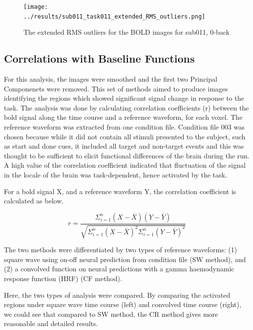 \documentclass[11pt]{article}
\begin{document}
\begin{figure}[H]
\centering
\texttt{[image: ../results/sub011\_task011\_extended\_RMS\_outliers.png]}
\caption{The extended RMS outliers for the BOLD images for sub011, 0-back}
\end{figure} 

\subsection{Correlations with Baseline Functions}

For this analysis, the images were smoothed and the first two Principal Componenets were
removed. This set of methods aimed to produce images identifying the regions which showed
significant signal change in response to the task. The analysis was done by calculating 
correlation coefficients (r) between the bold signal along the time course and a reference
waveform, for each voxel. The reference waveform was extracted from one condition file.
Condition file 003 was chosen because while it did not contain all stimuli presented to the
subject, such as start and done cues, it included all target and non-target events and this
was thought to be sufficient to elicit functional differences of the brain during the run. 
A high value of the correlation coefficient indicated that fluctuation of the signal in 
the locale of the brain was task-dependent, hence activated by the task. 

For a bold signal X, and a reference waveform Y, the correlation coefficient is
calculated as below.

\begin{equation}
r = \frac{\Sigma_{i=1}^{n}  ( X-\bar{X}) ( Y-\bar{Y})}{\sqrt{ \Sigma_{i=1}^{n} (
    X-\bar{X} ) ^2 \Sigma_{i=1}^{n} ( Y-\bar{Y})  ^2 }}
\end{equation}

The two methods were differentiated by two types of reference
waveforms: (1) square wave using on-off neural prediction from condition file
(SW method), and (2) a convolved function on neural predictions with a gamma
haemodynamic response function (HRF) (CF method).

Here, the two types of analysis were compared. By comparing
the activated regions under square wave time course (left) and convolved time
course (right), we could see that compared to SW method, the CR method gives 
more reasonable and detailed results.
\end{document}
